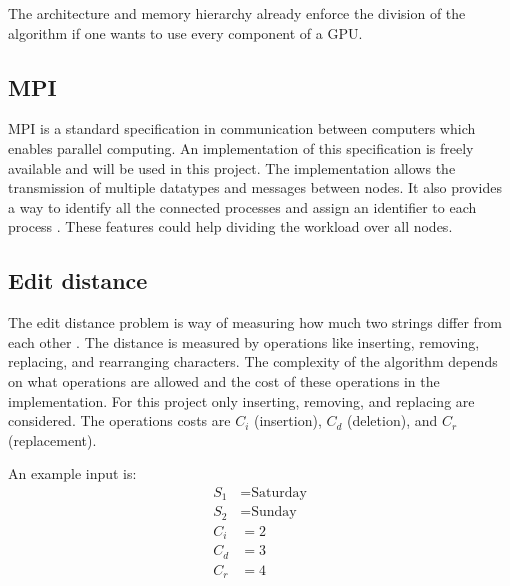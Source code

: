 The architecture and memory hierarchy already enforce the division of the algorithm if one wants to use every component of a GPU.

\subsection{MPI}
MPI is a standard specification in communication between computers which enables parallel computing.
An implementation of this specification is freely available and will be used in this project.
The implementation allows the transmission of multiple datatypes and messages between nodes.
It also provides a way to identify all the connected processes and assign an identifier to each process \cite{MPI}.
These features could help dividing the workload over all nodes.

\subsection{Edit distance}
The edit distance problem is way of measuring how much two strings differ from each other \cite{Navarro:2001:GTA:375360.375365}.
The distance is measured by operations like inserting, removing, replacing, and rearranging characters.
The complexity of the algorithm depends on what operations are allowed and the cost of these operations in the implementation.
For this project only inserting, removing, and replacing are considered.
The operations costs are $C_i$ (insertion), $C_d$ (deletion), and $C_r$ (replacement).

An example input is:
\begin{align*}
S_1 &= \text{Saturday}\\
S_2 &= \text{Sunday}\\
C_i &= 2\\
C_d &= 3\\
C_r &= 4
\end{align*}

